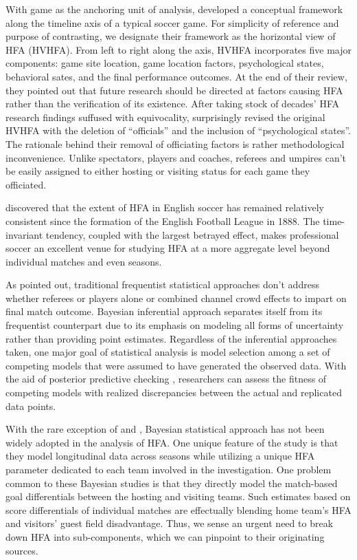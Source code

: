 \documentclass[USenglish]{article}
\begin{document}
With game as the anchoring unit of analysis, \cite{Courneya1992} developed a conceptual framework along the timeline axis of a typical soccer game. For simplicity of reference and purpose of contrasting, we designate their framework as the horizontal view of HFA (HVHFA). From left to right along the axis, HVHFA incorporates five major components: game site location, game location factors, psychological states, behavioral sates, and the final performance outcomes. At the end of their review, they pointed out that future research should be directed at factors causing HFA rather than the verification of its existence. After taking stock of decades' HFA research findings suffused with equivocality, \cite{Carron2005} surprisingly revised the original HVHFA with the deletion of ``officials'' and the inclusion of ``psychological states''. The rationale behind their removal of officiating factors is rather methodological inconvenience. Unlike spectators, players and coaches, referees and umpires can't be easily assigned to either hosting or visiting status for each game they officiated. 


\cite{Pollard1986} discovered that the extent of HFA in English soccer has remained relatively consistent since the formation of the English Football League in 1888. The time-invariant tendency, coupled with the largest betrayed effect, makes professional soccer an excellent venue for studying HFA at a more aggregate level beyond individual matches and even seasons. 

 

As \cite{Boyko2007} pointed out, traditional frequentist statistical approaches don't address whether referees or players alone or combined channel crowd effects to impart on final match outcome. Bayesian inferential approach separates itself from its frequentist counterpart due to its emphasis on modeling all forms of uncertainty rather than providing point estimates. Regardless of the inferential approaches taken, one major goal of statistical analysis is model selection among a set of competing models that were assumed to have generated the observed data. With the aid of posterior predictive checking \citep{Gelman1996}, researchers can assess the fitness of competing models with realized discrepancies between the actual and replicated data points. 

With the rare exception of \cite{Gajewski2006} and \cite{Glickman1998, Glickman2005}, Bayesian statistical approach has not been widely adopted in the analysis of HFA. One unique feature of the \cite{Gajewski2006} study is that they model longitudinal data across seasons while utilizing a unique HFA parameter dedicated to each team involved in the investigation. One problem common to these Bayesian studies is that they directly model the match-based goal differentials between the hosting and visiting teams. Such estimates based on score differentials of individual matches are effectually  blending home team's HFA and visitors' guest field disadvantage. Thus, we sense an urgent need to break down HFA into sub-components, which we can pinpoint to their originating sources.    
\end{document}
